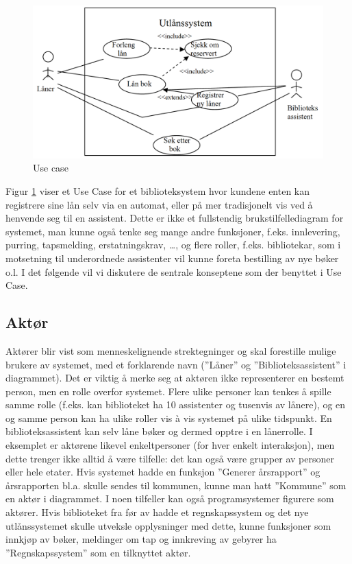 \begin{figure}[H]
    \centering
    \includegraphics[scale=0.35]{resources/use-case-example.PNG}
    \caption{Use case}
    \label{fig:use-case-example}
\end{figure}

Figur \ref{fig:use-case-example} viser et Use Case for et biblioteksystem hvor kundene enten kan registrere sine lån selv via en automat, eller på mer tradisjonelt vis ved å henvende seg til en assistent. Dette er ikke et fullstendig brukstilfellediagram for systemet, man kunne også tenke seg mange andre funksjoner, f.eks. innlevering, purring, tapsmelding, erstatningskrav, …, og flere roller, f.eks. bibliotekar, som i motsetning til underordnede assistenter vil kunne foreta bestilling av nye bøker o.l. I det følgende vil vi diskutere de sentrale konseptene som der benyttet i Use Case.

\subsection{Aktør}

Aktører blir vist som menneskelignende strektegninger og skal forestille mulige brukere av systemet, med et forklarende navn (”Låner” og ”Biblioteksassistent” i diagrammet). Det er viktig å merke seg at aktøren ikke representerer en bestemt person, men en rolle overfor systemet. Flere ulike personer kan tenkes å spille samme rolle (f.eks. kan biblioteket ha 10 assistenter og tusenvis av lånere), og en og samme person kan ha ulike roller vis à vis systemet på ulike tidspunkt. En biblioteksassistent kan selv låne bøker og dermed opptre i en lånerrolle. I eksemplet er aktørene likevel enkeltpersoner (for hver enkelt interaksjon), men dette trenger ikke alltid å være tilfelle: det kan også være grupper av personer eller hele etater. Hvis systemet hadde en funksjon ”Generer årsrapport” og årsrapporten bl.a. skulle sendes til kommunen, kunne man hatt ”Kommune” som en aktør i diagrammet. I noen tilfeller kan også programsystemer figurere som aktører. Hvis biblioteket fra før av hadde et regnskapssystem og det nye utlånssystemet skulle utveksle opplysninger med dette, kunne funksjoner som innkjøp av bøker, meldinger om tap og innkreving av gebyrer ha ”Regnskapssystem” som en tilknyttet aktør.

